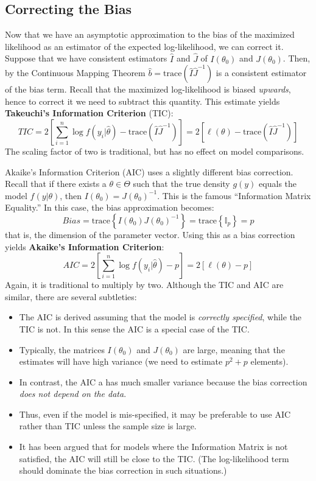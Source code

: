 \documentclass[12pt]{article}
\theoremstyle{definition}
\begin{document}
\subsection{Correcting the Bias}
Now that we have an asymptotic approximation to the bias of the maximized likelihood as an estimator of the expected log-likelihood, we can correct it. Suppose that we have consistent estimators $\hat{I}$ and $\hat{J}$ of $I(\theta_0)$ and $J(\theta_0)$. Then, by the Continuous Mapping Theorem $\hat{b}=\mbox{trace}(\hat{I}\hat{J}^{-1})$ is a consistent estimator of the bias term. Recall that the maximized log-likelihood is biased \emph{upwards}, hence to correct it we need to subtract this quantity. This estimate yields \textbf{Takeuchi's Information Criterion} (TIC):
	$$TIC = 2\left[ \sum_{i=1}^n \log{f\left( y_i | \hat{\theta} \right)} - \mbox{trace}(\hat{I}\hat{J}^{-1}) \right] = 2 \left[\ell(\theta) - \mbox{trace}\left(\widehat{I}\widehat{J}^{-1}\right) \right]$$
The scaling factor of two is traditional, but has no effect on model comparisons.

Akaike's Information Criterion (AIC) uses a slightly different bias correction. Recall that if there exists a $\theta \in \Theta$ such that the true density $g(y)$ equals the model $f(y|\theta)$, then $I(\theta_0)=J(\theta_0)^{-1}$. This is the famous ``Information Matrix Equality.'' In this case, the bias approximation becomes:
	$$Bias = \mbox{trace}\left\{ I(\theta_0)J(\theta_0)^{-1} \right\} = \mbox{trace}\left\{ \mathbb{I}_p \right\}=p$$
that is, the dimension of the parameter vector. Using this as a bias correction yields \textbf{Akaike's Information Criterion}:
	$$AIC = 2\left[ \sum_{i=1}^n \log{f\left( y_i | \hat{\theta} \right)} - p \right] = 2\left[ \ell(\theta) - p \right]$$
Again, it is traditional to multiply by two. Although the TIC and AIC are similar, there are several subtleties:
	\begin{itemize}
		\item The AIC is derived assuming that the model is \emph{correctly specified}, while the TIC is not. In this sense the AIC is a special case of the TIC.
		\item Typically, the matrices $I(\theta_0)$ and $J(\theta_0)$ are large, meaning that the estimates will have high variance (we need to estimate $p^2 + p$ elements).
		\item In contrast, the AIC a has much smaller variance because the bias correction \emph{does not depend on the data}. 
		\item Thus, even if the model is mis-specified, it may be preferable to use AIC rather than TIC unless the sample size is large.
		\item It has been argued that for models where the Information Matrix is not satisfied, the AIC will still be close to the TIC. (The log-likelihood term should dominate the bias correction in such situations.)
	\end{itemize}
\end{document}
